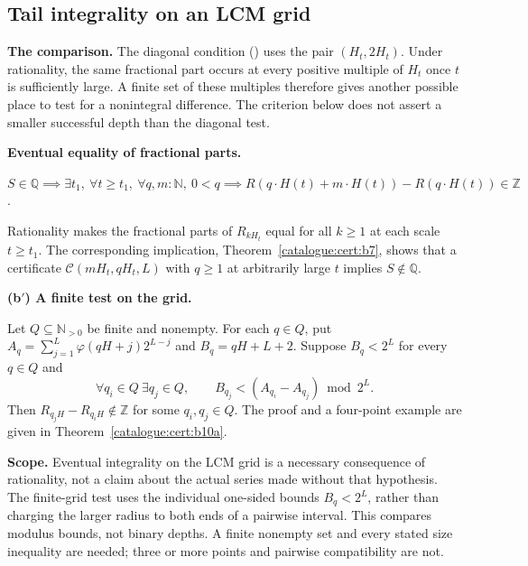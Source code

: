 \subsection{Tail integrality on an LCM grid}

\textbf{The comparison.} The diagonal condition
()
uses the pair $(H_t,2H_t)$. Under rationality, the same fractional part
occurs at every positive multiple of $H_t$ once $t$ is sufficiently
large. A finite set of these multiples therefore gives another possible
place to test for a nonintegral difference. The criterion below does not
assert a smaller successful depth than the diagonal test.

\textbf{Eventual equality of fractional parts.}
\begin{prop}\label{prop:tail-integrality-lcm-grid}
\(S\in\mathbb Q \implies \exists t_1,\ \forall t\ge t_1,\
\forall q,m:\mathbb N,\ 0<q \implies {R}(q\cdot
{H}(t)+m\cdot{H}(t)) -
{R}(q\cdot{H}(t)) \in
\mathbb Z\).
\end{prop}
Rationality makes the fractional parts of $R_{kH_t}$ equal for all
$k\ge1$ at each scale $t\ge t_1$. The corresponding implication,
Theorem~\ref{catalogue:cert:b7}, shows that a certificate $\mathcal C(mH_t,qH_t,L)$ with $q\ge1$
at arbitrarily large $t$ implies $S\notin\mathbb Q$.


\textbf{(b\('\)) A finite test on the grid.}
\begin{prop}\label{prop:finite-grid-certificate-gives-nonintegral}
Let $Q\subseteq\mathbb N_{>0}$ be finite and nonempty. For each $q\in Q$,
put $A_q=\sum_{j=1}^{L}\varphi(qH+j)2^{L-j}$ and $B_q=qH+L+2$.
Suppose $B_q<2^L$ for every $q\in Q$ and
\[
 \forall q_i\in Q\ \exists q_j\in Q,\qquad
 B_{q_j}<(A_{q_i}-A_{q_j})\bmod2^L.
\]
Then $R_{q_jH}-R_{q_iH}\notin\mathbb Z$ for some $q_i,q_j\in Q$.
The proof and a four-point example are given in
Theorem~\ref{catalogue:cert:b10a}.
\end{prop}

\textbf{Scope.} Eventual integrality on the LCM grid is a necessary
consequence of rationality, not a claim about the actual series made
without that hypothesis. The finite-grid test uses the individual
one-sided bounds $B_q<2^L$, rather than charging the larger radius to
both ends of a pairwise interval. This compares modulus bounds, not
binary depths. A finite nonempty set and every stated size inequality
are needed; three or more points and pairwise compatibility are not.

